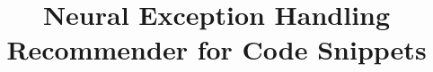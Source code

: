 \documentclass[sigconf,review,anonymous]{acmart}
\begin{document}

\title[Neural Exception Handling Recommender for Code Snippets]{Neural Exception Handling Recommender for Code Snippets}



\renewcommand\footnotetextcopyrightpermission[1]{} %








\end{document}
